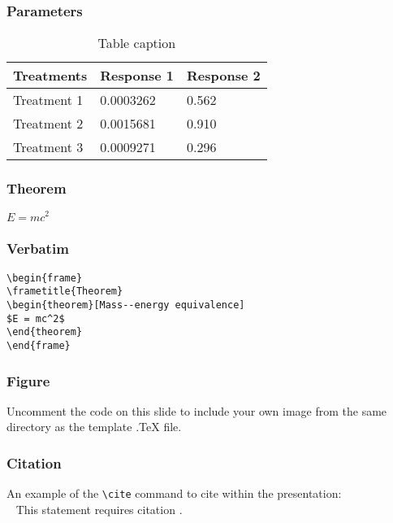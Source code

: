 \documentclass{beamer}
\begin{document}
\begin{frame}
\frametitle{Parameters}
\begin{table}
\begin{tabular}{l l l}
\toprule
\textbf{Treatments} & \textbf{Response 1} & \textbf{Response 2}\\
\midrule
Treatment 1 & 0.0003262 & 0.562 \\
Treatment 2 & 0.0015681 & 0.910 \\
Treatment 3 & 0.0009271 & 0.296 \\
\bottomrule
\end{tabular}
\caption{Table caption}
\end{table}
\end{frame}
\begin{frame}
\frametitle{Theorem}
\begin{theorem}
$E = mc^2$
\end{theorem}
\end{frame}
\begin{frame}[fragile] %
\frametitle{Verbatim}
\begin{example}
\begin{verbatim}
\begin{frame}
\frametitle{Theorem}
\begin{theorem}[Mass--energy equivalence]
$E = mc^2$
\end{theorem}
\end{frame}\end{verbatim}
\end{example}
\end{frame}
\begin{frame}
\frametitle{Figure}
Uncomment the code on this slide to include your own image from the same directory as the template .TeX file.
\end{frame}
\begin{frame}[fragile] %
\frametitle{Citation}
An example of the \verb|\cite| command to cite within the presentation:\\~
This statement requires citation \cite{p1}.
\end{frame}
\fi %
\end{document}
